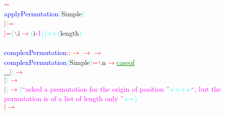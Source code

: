 \hsspace \hsspace \hsspace \hsspace \hsspace \textcolor{red}{=}\\\textcolor{blue}{applyPermutation}\hsspace \textcolor{cyan}{(}{\rm{}Simple}\textcolor{cyan}{)}\\\hstab \textcolor{red}{\ensuremath{|}}\hsspace \textcolor{cyan}{\ensuremath{\langle}}\hsspace \textcolor{red}{=}\\\hstab \textcolor{red}{\ensuremath{|}}\hsspace \textcolor{red}{=}\hsspace \textcolor{cyan}{(}\textcolor{red}{$\backslash$}{\rm{}i}\hsspace \textcolor{red}{\ensuremath{\rightarrow}}\hsspace \textcolor{cyan}{(}{\rm{}i}\textcolor{blue}{{\it{}-}}\textcolor{magenta}{1}\textcolor{cyan}{)}\textcolor{cyan}{)}\hsspace \textcolor{cyan}{++}\hsspace \textcolor{cyan}{(}{\rm{}length}\textcolor{cyan}{)}\\\\\textcolor{blue}{complexPermutation}\hsspace \textcolor{red}{::}\hsspace \textcolor{red}{\ensuremath{\rightarrow}}\hsspace \textcolor{red}{\ensuremath{\rightarrow}}\hsspace \textcolor{red}{\ensuremath{\rightarrow}}\\\textcolor{blue}{complexPermutation}\hsspace \textcolor{cyan}{(}{\rm{}Simple}\textcolor{cyan}{)}\hsspace \textcolor{red}{=}\hsspace \textcolor{red}{$\backslash$}{\rm{}n}\hsspace \textcolor{red}{\ensuremath{\rightarrow}}\hsspace \textcolor{green}{\underline{case}}\hsspace {\rm{}()}\hsspace \textcolor{green}{\underline{of}}\\\hstab \textcolor{green}{\underline{\_}}\hsspace \textcolor{red}{\ensuremath{|}}\hsspace \textcolor{cyan}{\ensuremath{\langle}}\hsspace \hsspace \hsspace \textcolor{red}{\ensuremath{\rightarrow}}\\\hstab \hsspace \hsspace \textcolor{red}{\ensuremath{|}}\hsspace \textcolor{cyan}{\ensuremath{\rangle}}\hsspace \hsspace \hsspace \textcolor{red}{\ensuremath{\rightarrow}}\\\hstab \hsspace \hsspace \textcolor{red}{\ensuremath{|}}\hsspace \textcolor{cyan}{\ensuremath{\rangle}}\hsspace \hsspace \hsspace \hsspace \hsspace \textcolor{red}{\ensuremath{\rightarrow}}\hsspace \textcolor{cyan}{(}\textcolor{magenta}{``asked a premutation for the origin of position ''}\hsspace \textcolor{cyan}{++}\hsspace \textcolor{cyan}{++}\hsspace \textcolor{magenta}{``, but the permutation is of a list of length only ''}\hsspace \textcolor{cyan}{++}\textcolor{cyan}{)}\\\hstab \hsspace \hsspace \textcolor{red}{\ensuremath{|}}\hsspace \textcolor{red}{\ensuremath{\rightarrow}}\hsspace 